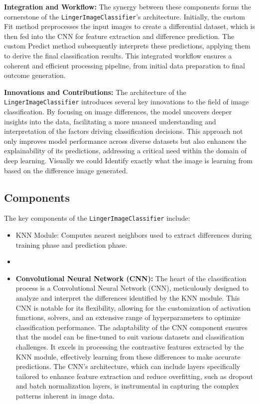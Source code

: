 \documentclass[a4paper, 12pt]{report}
\begin{document}
\textbf{Integration and Workflow:}
The synergy between these components forms the cornerstone of the \texttt{LingerImageClassifier}'s architecture. Initially, the custom Fit method preprocesses the input images to create a differential dataset, which is then fed into the CNN for feature extraction and difference prediction. The custom Predict method subsequently interprets these predictions, applying them to derive the final classification results. This integrated workflow ensures a coherent and efficient processing pipeline, from initial data preparation to final outcome generation.

\textbf{Innovations and Contributions:}
The architecture of the \texttt{LingerImageClassifier} introduces several key innovations to the field of image classification. 
By focusing on image differences, the model uncovers deeper insights into the data, facilitating a more nuanced understanding and interpretation 
of the factors driving classification decisions. This approach not only improves model performance across diverse datasets but also enhances the 
explainability of its predictions, addressing a critical need within the domain of deep learning. 
Visually we could Identify exactly what the image is learning from based on the difference image generated.

\subsection{Components}
\label{sec:image_class_reg_components}
The key components of the \texttt{LingerImageClassifier} include:
\begin{itemize}
\item KNN Module: Computes nearest neighbors used to extract differences during training phase and prediction phase.
\item 
\item \textbf{Convolutional Neural Network (CNN):} The heart of the classification process is a Convolutional Neural Network (CNN), 
    meticulously designed to analyze and interpret the differences identified by the KNN module. This CNN is notable for its flexibility, 
    allowing for the customization of activation functions, solvers, and an extensive range of hyperparameters to optimize classification performance. 
    The adaptability of the CNN component ensures that the model can be fine-tuned to suit various datasets and classification challenges. 
    It excels in processing the contrastive features extracted by the KNN module, effectively learning from these differences to make accurate predictions. 
    The CNN's architecture, which can include layers specifically tailored to enhance feature extraction and reduce overfitting, such as dropout 
    and batch normalization layers, is instrumental in capturing the complex patterns inherent in image data.
\end{itemize}
\end{document}

